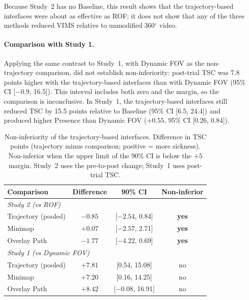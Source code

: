 Because Study~2 has no Baseline, this result shows that the trajectory-based
interfaces were about as effective as ROF; it does not show that any of the
three methods reduced VIMS relative to unmodified 360$^\circ$ video.

\paragraph{Comparison with Study 1.}
Applying the same contrast to Study~1, with Dynamic FOV as the non-trajectory
comparison, did not establish non-inferiority: post-trial TSC was 7.8 points
higher with the trajectory-based interfaces than with Dynamic FOV (95\% CI
[$-0.9$, 16.5]). This interval includes both zero and the margin, so the
comparison is inconclusive. In Study~1, the trajectory-based interfaces still
reduced TSC by 15.5 points relative to Baseline (95\% CI [6.5, 24.4]) and
produced higher Presence than Dynamic FOV ($+0.55$, 95\% CI [0.26, 0.84]).

\begin{table}[t]
  \caption{Non-inferiority of the trajectory-based interfaces. Difference in
  TSC points (trajectory minus comparison; positive = more sickness).
  Non-inferior when the upper limit of the 90\% CI is below the $+5$ margin.
  Study~2 uses the pre-to-post change; Study~1 uses post-trial TSC.}
  \label{tab:s2-ni}
  \centering
  \footnotesize
  \begin{tabular}{lccc}
    \toprule
    \textbf{Comparison} & \textbf{Difference} & \textbf{90\% CI} & \textbf{Non-inferior} \\
    \midrule
    \multicolumn{4}{l}{\textit{Study 2 (vs ROF)}} \\
    Trajectory (pooled) & $-0.85$ & [$-2.54$, 0.84] & \textbf{yes} \\
    Minimap             & $+0.07$ & [$-2.57$, 2.71] & \textbf{yes} \\
    Overlay Path        & $-1.77$ & [$-4.22$, 0.69] & \textbf{yes} \\
    \midrule
    \multicolumn{4}{l}{\textit{Study 1 (vs Dynamic FOV)}} \\
    Trajectory (pooled) & $+7.81$ & [0.54, 15.08]   & no \\
    Minimap             & $+7.20$ & [0.16, 14.25]   & no \\
    Overlay Path        & $+8.42$ & [$-0.08$, 16.91] & no \\
    \bottomrule
  \end{tabular}
\end{table}

